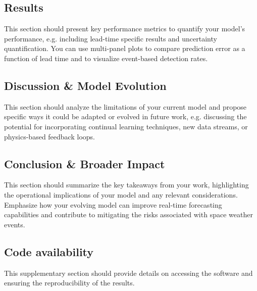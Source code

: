 \documentclass[11pt,a4paper]{storm-ai_report}
\begin{document}
\subsection{Results}
This section should present key performance metrics to quantify your model's performance, e.g. including lead-time specific results and uncertainty quantification. You can use multi-panel plots to compare prediction error as a function of lead time and to visualize event-based detection rates.

\subsection{Discussion \& Model Evolution}
This section should analyze the limitations of your current model and propose specific ways it could be adapted or evolved in future work, e.g. discussing the potential for incorporating continual learning techniques, new data streams, or physics-based feedback loops.

\subsection{Conclusion \& Broader Impact}
This section should summarize the key takeaways from your work, highlighting the operational implications of your model and any relevant considerations. Emphasize how your evolving model can improve real-time forecasting capabilities and contribute to mitigating the risks associated with space weather events.

\subsection{Code availability}
This supplementary section should provide details on accessing the software and ensuring the reproducibility of the results.

\printbibliography
\end{document}
